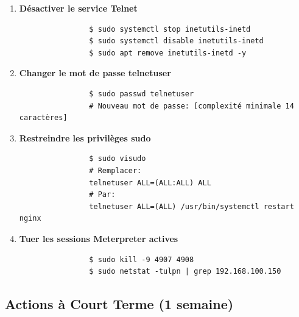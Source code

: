 \documentclass[12pt,a4paper,openany]{report}
\begin{document}
	\begin{tcolorbox}[colback=accent!5!white, colframe=accent, title=\textbf{PRIORITÉ CRITIQUE}]
		\begin{enumerate}
			\item \textbf{Désactiver le service Telnet}
			\begin{lstlisting}
				$ sudo systemctl stop inetutils-inetd
				$ sudo systemctl disable inetutils-inetd
				$ sudo apt remove inetutils-inetd -y
			\end{lstlisting}
			
			\item \textbf{Changer le mot de passe telnetuser}
			\begin{lstlisting}
				$ sudo passwd telnetuser
				# Nouveau mot de passe: [complexité minimale 14 caractères]
			\end{lstlisting}
			
			\item \textbf{Restreindre les privilèges sudo}
			\begin{lstlisting}
				$ sudo visudo
				# Remplacer:
				telnetuser ALL=(ALL:ALL) ALL
				# Par:
				telnetuser ALL=(ALL) /usr/bin/systemctl restart nginx
			\end{lstlisting}
			
			\item \textbf{Tuer les sessions Meterpreter actives}
			\begin{lstlisting}
				$ sudo kill -9 4907 4908
				$ sudo netstat -tulpn | grep 192.168.100.150
			\end{lstlisting}
		\end{enumerate}
	\end{tcolorbox}
	
	\subsection{Actions à Court Terme (1 semaine)}
	
\end{document}
